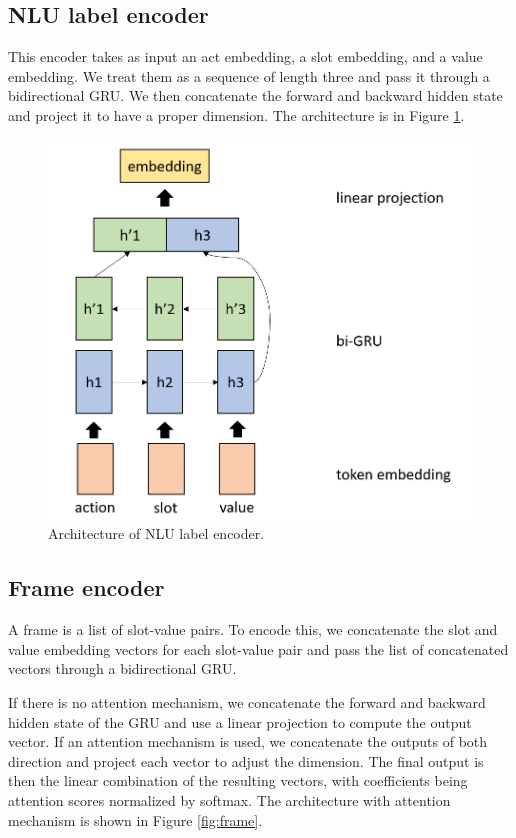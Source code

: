 \subsection{NLU label encoder}
This encoder takes as input an act embedding, a slot embedding, and a value embedding. We treat them as a sequence of length three and pass it through a bidirectional GRU. We then concatenate the forward and backward hidden state and project it to have a proper dimension. The architecture is in Figure \ref{fig:nlu-label}.

\begin{figure}
    \centering
    \includegraphics[width=0.7\columnwidth]{figures/utterance.png}
    \caption[NLU label encoder]{Architecture of NLU label encoder.}
    \label{fig:nlu-label}
\end{figure}

\subsection{Frame encoder}
A frame is a list of slot-value pairs. To encode this, we concatenate the slot and value embedding vectors for each slot-value pair and pass the list of concatenated vectors through a bidirectional GRU.

If there is no attention mechanism, we concatenate the forward and backward hidden state of the GRU and use a linear projection to compute the output vector. If an attention mechanism is used, we concatenate the outputs of both direction and project each vector to adjust the dimension. The final output is then the linear combination of the resulting vectors, with coefficients being attention scores normalized by softmax. The architecture with attention mechanism is shown in Figure \ref{fig:frame}.

